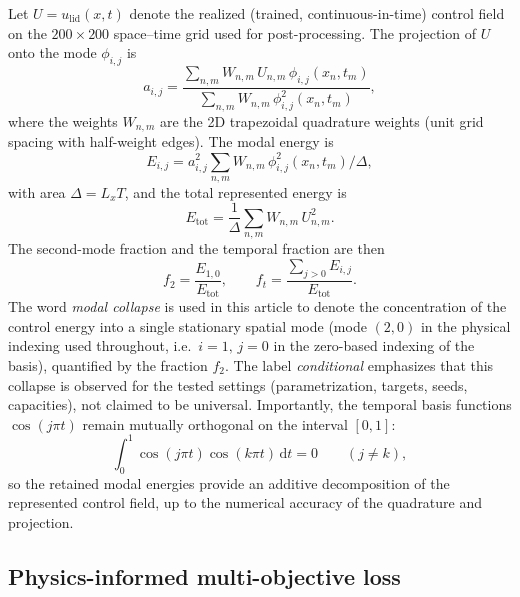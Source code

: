 \documentclass[aip,pof,reprint,superscriptaddress]{revtex4-2}
\begin{document}
Let $U=u_{\mathrm{lid}}(x,t)$ denote the realized (trained, continuous-in-time) control field on the $200\times200$ space--time grid used for post-processing. The projection of $U$ onto the mode $\phi_{i,j}$ is
\begin{equation}\label{eq:projection}
a_{i,j}=\frac{\displaystyle\sum_{n,m}W_{n,m}\,U_{n,m}\,\phi_{i,j}(x_n,t_m)}{\displaystyle\sum_{n,m}W_{n,m}\,\phi_{i,j}^2(x_n,t_m)},
\end{equation}
where the weights $W_{n,m}$ are the 2D trapezoidal quadrature weights (unit grid spacing with half-weight edges). The modal energy is
\begin{equation}\label{eq:modalenergy}
E_{i,j}=a_{i,j}^2\sum_{n,m}W_{n,m}\,\phi_{i,j}^2(x_n,t_m)\Big/\Delta,
\end{equation}
with area $\Delta=L_xT$, and the total represented energy is
\begin{equation}\label{eq:totalmodalenergy}
E_{\mathrm{tot}}=\frac{1}{\Delta}\sum_{n,m}W_{n,m}\,U_{n,m}^2.
\end{equation}
The second-mode fraction and the temporal fraction are then
\begin{equation}\label{eq:f2}
f_2=\frac{E_{1,0}}{E_{\mathrm{tot}}},\qquad
f_t=\frac{\displaystyle\sum_{j>0}E_{i,j}}{E_{\mathrm{tot}}}.
\end{equation}
The word \emph{modal collapse} is used in this article to denote the concentration of the control energy into a single stationary spatial mode (mode $(2,0)$ in the physical indexing used throughout, i.e.\ $i=1,\,j=0$ in the zero-based indexing of the basis), quantified by the fraction $f_2$. The label \emph{conditional} emphasizes that this collapse is observed for the tested settings (parametrization, targets, seeds, capacities), not claimed to be universal. Importantly, the temporal basis functions $\cos(j\pi t)$ remain mutually orthogonal on the interval $[0,1]$:
\begin{equation}\label{eq:ortho}
\int_0^1\cos(j\pi t)\cos(k\pi t)\,\mathrm{d}t=0\qquad(j\ne k),
\end{equation}
so the retained modal energies provide an additive decomposition of the represented control field, up to the numerical accuracy of the quadrature and projection.

\subsection{Physics-informed multi-objective loss}
\end{document}
